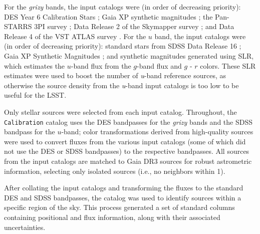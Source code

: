 For the \textit{grizy} bands, the input catalogs were (in order of decreasing priority): \gls{DES} Year 6 Calibration Stars \citep[][]{2023arXiv230501695R}; Gaia \gls{XP} synthetic magnitudes \citep[][]{2023A&A...674A..33G}; the \gls{Pan-STARRS} 3PI survey \citep[][]{2016arXiv161205560C}; \gls{Data Release} 2 of the  Skymapper survey \citep[][]{2019PASA...36...33O}; and \gls{Data Release} 4 of the \gls{VST} \gls{ATLAS} survey \citep[][]{2015MNRAS.451.4238S}.
For the $u$ band, the input catalogs were (in order of decreasing priority): standard stars from \gls{SDSS} \gls{Data Release} 16 \citep[][]{2020ApJS..249....3A}; Gaia \gls{XP} Synthetic Magnitudes \citep[][]{2023A&A...674A..33G}; and synthetic magnitudes generated using \gls{SLR}, which estimates the $u$-band \gls{flux} from the $g$-band \gls{flux} and $g$ - $r$ colors.
These \gls{SLR} estimates were used to boost the number of \textit{u}-band reference sources, as otherwise the source density from the \textit{u}-band input catalogs is too low to be useful for the \gls{LSST}.

Only stellar sources were selected from each input catalog.
Throughout, the \texttt{Calibration} catalog uses the \gls{DES} bandpasses for the \textit{grizy} bands and the \gls{SDSS} bandpass for the $u$-band; color transformations derived from high-quality sources were used to convert fluxes from the various input catalogs (some of which did not use the \gls{DES} or SDSS bandpasses) to the respective bandpasses.
All sources from the input catalogs are matched to Gaia \gls{DR3} sources for robust astrometric information, selecting only isolated sources (i.e., no neighbors within 1\arcsec).

After collating the input catalogs and transforming the fluxes to the standard DES and SDSS bandpasses, the catalog was used to identify sources within a specific region of the sky.
This process generated a set of standard columns containing positional and flux information, along with their associated uncertainties.

